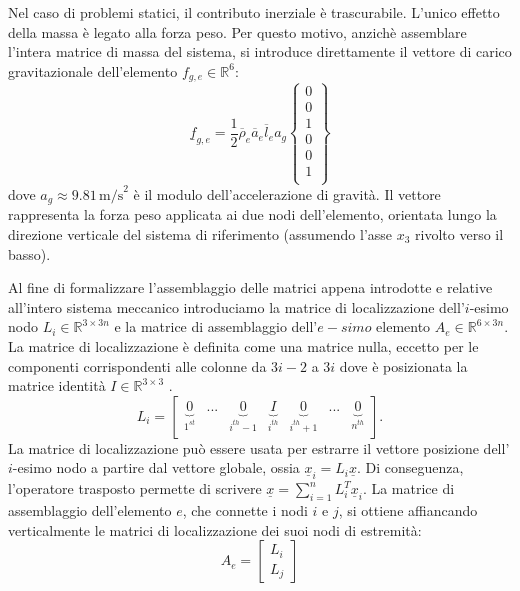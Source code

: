 Nel caso di problemi statici, il contributo inerziale è trascurabile. L'unico effetto della massa è legato alla forza peso. Per questo motivo, anzichè assemblare l'intera matrice di massa del sistema, si introduce direttamente il vettore di carico gravitazionale dell'elemento $f_{g,e} \in \mathbb{R}^6$:
\begin{equation}
   \underline{f}_{g,e} = \frac{1}{2}\overline{\rho}_e \overline{a}_e \overline{l}_e a_g
\left\{
\begin{array}{c}
0 \\
0 \\
1 \\
0 \\
0 \\
1 \\
\end{array}
\right\}
\end{equation}
dove $a_g \approx 9.81 \, \text{m/s}^2$ è il modulo dell'accelerazione di gravità. Il vettore rappresenta la forza peso applicata ai due nodi dell'elemento, orientata lungo la direzione verticale del sistema di riferimento (assumendo l'asse $x_3$ rivolto verso il basso).  

\vspace{1em}
Al fine di formalizzare l'assemblaggio delle matrici appena introdotte e relative all'intero sistema meccanico introduciamo la matrice di localizzazione dell'$i$-esimo nodo $L_i \in \mathbb{R}^{3\times3n}$ e la matrice di assemblaggio dell'$e-simo$ elemento $A_e \in \mathbb{R}^{6\times3n}$. 
La matrice di localizzazione è definita come una matrice nulla, eccetto per le componenti corrispondenti alle colonne da $3i -2$ a $3i$ dove è posizionata la matrice identità $I \in \mathbb{R}^{3\times3}$ .
\begin{equation}   
    L_i = \begin{bmatrix}\underbrace{\textit{0}}_{1^{st}} & ... & \underbrace{\textit{0}}_{i^{th}-1} & \underbrace{I}_{i^{th}} & \underbrace{\textit{0}}_{i^{th}+1} & ... & \underbrace{\textit{0}}_{n^{th}} \end{bmatrix}.
\label{eq:matrice_localizzazione}
\end{equation}
La matrice di localizzazione può essere usata per estrarre il vettore posizione dell'$i$-esimo nodo a partire dal vettore globale, ossia $\underline{x}_i = L_i \underline{x}$. Di conseguenza, l'operatore trasposto permette di scrivere $\underline{x} = \sum_{i=1}^{n} L_i^T \underline{x}_i$.
La matrice di assemblaggio dell'elemento $e$, che connette i nodi $i$ e $j$, si ottiene affiancando verticalmente le matrici di localizzazione dei suoi nodi di estremità: 
\begin{equation}
A_e =
\begin{bmatrix}
   L_i \\
   L_j
\end{bmatrix}
\label{eq:matrice_assemblaggio}
\end{equation}

